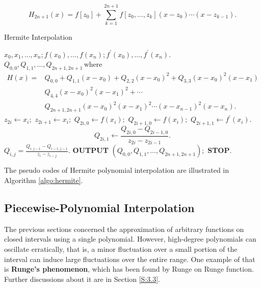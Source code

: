 \documentclass[preprint,12pt]{elsarticle}
\begin{document}
$$H_{2n+1}(x)=f[z_0]+\sum_{k=1}^{2n+1}{f[z_0,\dots,z_k](x-z_0)\cdots(x-z_{k-1})}.$$

\begin{algorithm}
    \caption{Hermite Interpolation}
    \label{algo:hermite}
    \begin{algorithmic}[1]
    \Require $x_0,x_1,\dots,x_n;f(x_0),\dots,f(x_n);f^{'}(x_0),\dots,f^{'}(x_n).$
    \Ensure $Q_{0,0},Q_{1,1},\dots,Q_{2n+1,2n+1}\,\mathrm{where}$ \begin{equation}\nonumber
        \begin{split}
            H(x)=& Q_{0,0}+Q_{1,1}(x-x_0)+Q_{2,2}(x-x_0)^{2}+Q_{3,3}(x-x_0)^{2}(x-x_1)\\
            & Q_{4,4}(x-x_0)^{2}(x-x_1)^{2}+\cdots\\
            & Q_{2n+1,2n+1}(x-x_0)^{2}(x-x_1)^{2}\cdots(x-x_{n-1})^{2}(x-x_n).
        \end{split}
    \end{equation}
        \State $z_{2i}\gets x_i;$
        \State $z_{2i+1}\gets x_i;$
        \State $Q_{2i,0}\gets f(x_i);$
        \State $Q_{2i+1,0}\gets f(x_i);$
        \State $Q_{2i+1,1}\gets f^{'}(x_i).$
            $$Q_{2i,1}\gets\frac{Q_{2i,0}-Q_{2i-1,0}}{z_{2i}-z_{2i-1}}.$$
        \EndIf
    \EndFor
            \State $Q_{i,j}=\frac{Q_{i,j-1}-Q_{i-1,j-1}}{z_{i}-z_{i-j}}.$
        \EndFor
    \EndFor
    \State \textbf{OUTPUT} $(Q_{0,0},Q_{1,1},\dots,Q_{2n+1,2n+1});$
    \State \textbf{STOP}.
    \end{algorithmic}
\end{algorithm}

The pseudo codes of Hermite polynomial interpolation are illustrated in Algorithm \ref{algo:hermite}.

\subsection{Piecewise-Polynomial Interpolation}
\label{SS:2.3}

The previous sections concerned the approximation of arbitrary functions on closed intervals using a single polynomial. However, high-degree polynomials can oscillate erratically, that is, a minor fluctuation over a small portion of the interval can induce large fluctuations over the entire range. One example of that is \textbf{Runge's phenomenon}, which has been found by Runge on Runge function. Further discussions about it are in Section \ref{S:3.3}.
\end{document}
